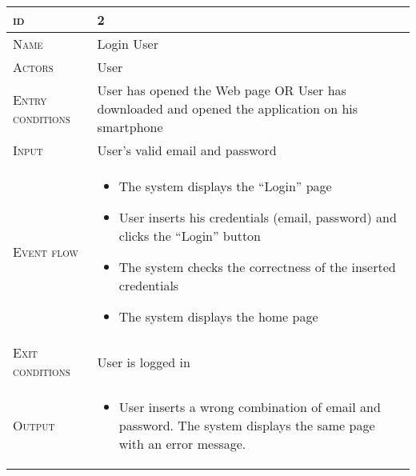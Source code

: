 \begin{table}[H]
    \centering
    \begin{tabular}[c]{|l|p{}|}
        \hline %
    	\textsc{id}                 &   2\\
    	\hline %
    	\textsc{Name}               &   Login User\\
    	\hline %
    	\textsc{Actors}             &   User\\
    	\hline %
    	\textsc{Entry conditions}   &   User has opened the Web page OR User has downloaded and opened the application on his smartphone\\
    	\hline %
    	\textsc{Input}   &   User’s valid email and password\\
    	\hline %
    	\textsc{Event flow}         &   %
            	                        \begin{itemize}
                                    	    \item The system displays the “Login” page
                                            \item User inserts his credentials (email, password) and clicks the “Login” button
                                            \item The system checks the correctness of the inserted credentials
                                            \item The system displays the home page


                                        \end{itemize}\\
        \hline %
        \textsc{Exit conditions}    &  User is logged in\\
    	\hline %
    	\textsc{Output}             &  \begin{itemize}
    	    \item User inserts a wrong combination of email and password. The system displays the same page with an error message.


\end{itemize}
\end{tabular}
\end{table}
